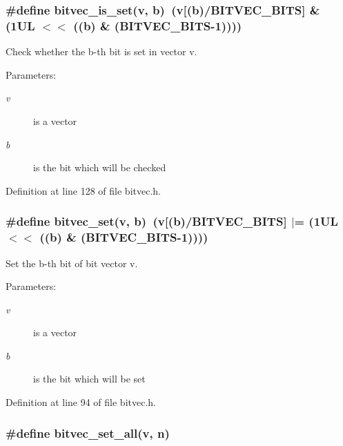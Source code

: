 \subsubsection[{bitvec\_\-is\_\-set}]{\setlength{\rightskip}{0pt plus 5cm}\#define bitvec\_\-is\_\-set(v, \/  b)~(v[(b)/BITVEC\_\-BITS] \& (1UL $<$$<$ ((b) \& (BITVEC\_\-BITS-1))))}\label{bitvec_8h_e323f80288b2ff946d6d8b0e38f791c9}


Check whether the b-th bit is set in vector v. 

\begin{Desc}
\item[Parameters:]
\begin{description}
\item[{\em v}]is a vector \item[{\em b}]is the bit which will be checked \end{description}
\end{Desc}


Definition at line 128 of file bitvec.h.
\subsubsection[{bitvec\_\-set}]{\setlength{\rightskip}{0pt plus 5cm}\#define bitvec\_\-set(v, \/  b)~(v[(b)/BITVEC\_\-BITS] $|$= (1UL $<$$<$ ((b) \& (BITVEC\_\-BITS-1))))}\label{bitvec_8h_e90878b8f2316f5733d83a3f47d378ac}


Set the b-th bit of bit vector v. 

\begin{Desc}
\item[Parameters:]
\begin{description}
\item[{\em v}]is a vector \item[{\em b}]is the bit which will be set \end{description}
\end{Desc}


Definition at line 94 of file bitvec.h.
\subsubsection[{bitvec\_\-set\_\-all}]{\setlength{\rightskip}{0pt plus 5cm}\#define bitvec\_\-set\_\-all(v, \/  n)}\label{bitvec_8h_b7abefb917e02790e9384d3149ff461e}


